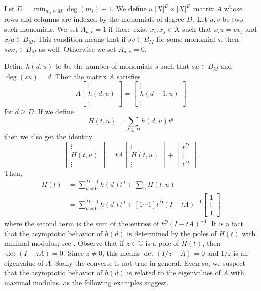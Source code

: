 Let $D = \min_{m_i \in M} \deg(m_i) - 1$. We define a $|X|^D \times |X|^D$ matrix $A$ whose rows and columns are indexed by the monomials of degree $D$. Let $u,v$ be two such monomials. We set $A_{u,v} = 1$ if there exist $x_i, x_j \in X$ such that $x_i u = v x_j$ and $x_i u \in B_M$. This condition means that if $sv \in B_M$ for some monomial $s$, then $svx_j \in B_M$ as well. Otherwise we set $A_{u,v} = 0$.

Define $h(d,u)$ to be the number of monomials $s$ such that $su\in B_M$ and $\deg(su) = d$. Then the matrix $A$ satisfies
\[
	A\begin{bmatrix}
	\vdots\\
	h(d,u)\\
	\vdots
	\end{bmatrix}
	=\begin{bmatrix}
	\vdots\\
	h(d+1,u)\\
	\vdots
	\end{bmatrix}
\]
for $d \geq D$. If we define
\[
	H(t,u) = \sum_{d\geq D} h(d,u)t^d
\]
then we also get the identity
\[
	\begin{bmatrix}
	\vdots\\
	H(t,u)\\
	\vdots
	\end{bmatrix}=
	tA\begin{bmatrix}
	\vdots\\
	H(t,u)\\
	\vdots
	\end{bmatrix}+
	\begin{bmatrix}
	t^D\\
	\vdots\\
	t^D
	\end{bmatrix}.
\]
Then,
\begin{align}
	H(t) &= \sum_{d=0}^{D-1} h(d)t^d + \sum_u H(t,u) \nonumber\\
	&= \sum_{d=0}^{D-1} h(d)t^d + [1 \cdots 1]
	t^D (I - tA)^{-1} \begin{bmatrix}
		1\\
		\vdots\\
		1
	\end{bmatrix} \label{eq:Poincare-series-formula}
\end{align}
where the second term is the sum of the entries of $t^D(I-tA)^{-1}$. It is a fact that the asymptotic behavior of $h(d)$ is determined by the poles of $H(t)$ with minimal modulus; see \cite[Theorem 5.2.1]{wilf}. Observe that if $z \in \mathbb{C}$ is a pole of $H(t)$, then $\det(I-zA) = 0$. Since $z \neq 0$, this means $\det(I/z - A) = 0$ and $1/z$ is an eigenvalue of $A$. Sadly the converse is not true in general. Even so, we suspect that the asymptotic behavior of $h(d)$ is related to the eigenvalues of $A$ with maximal modulus, as the following examples suggest.
